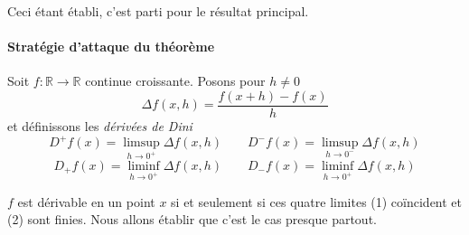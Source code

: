 \documentclass[a4paper, 11pt]{article}
\def\R{\mathbb{R}}
\begin{document}
Ceci étant établi, c'est parti pour le résultat principal.

\paragraph{Stratégie d'attaque du théorème}
Soit $f : \R \to \R$ continue croissante. Posons pour $h \neq 0$
\[ \Delta f(x,h) = \frac{f(x+h) - f(x)}{h} \]
et définissons les \emph{dérivées de Dini}
\[ D^+f(x) = \limsup_{h \to 0^+} \Delta f(x,h) \qquad
  D^-f(x) = \limsup_{h \to 0^-} \Delta f(x,h) \]
\[  D_+f(x) = \liminf_{h \to 0^+} \Delta f(x,h) \qquad
  D_-f(x) = \liminf_{h \to 0^+} \Delta f(x,h) \]

$f$ est dérivable en un point $x$ si et seulement si ces quatre limites (1)
coïncident et (2) sont finies. Nous allons établir que c'est le cas presque
partout.
\end{document}
